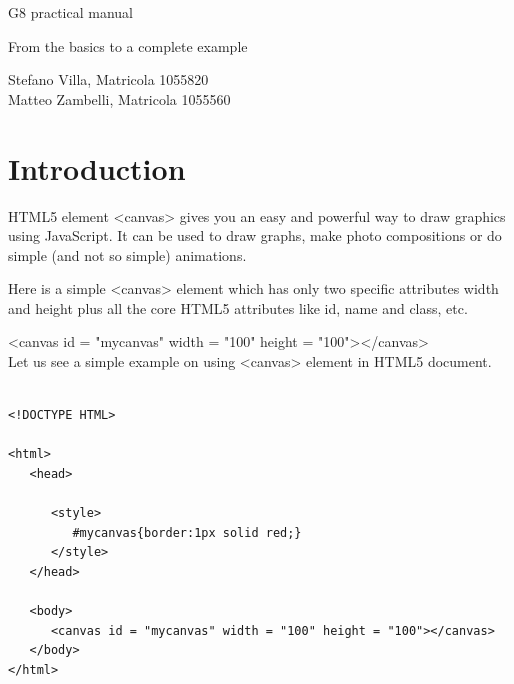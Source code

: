 \documentclass[a4paper]{article}
\begin{document}
\vspace{3\baselineskip}

\begin{center}
\begin{Huge}
G8 practical manual
\end{Huge}
\end{center}
\begin{center}
\begin{Huge}
From the basics to a complete example
\end{Huge}
\end{center}

\vspace{3\baselineskip}

\begin{Large}
\begin{center}
Stefano Villa, Matricola 1055820\\
Matteo Zambelli, Matricola 1055560
\end{center}
\end{Large}

\newpage
\tableofcontents
\newpage

\section{Introduction}

HTML5 element <canvas> gives you an easy and powerful way to draw graphics using JavaScript. It can be used to draw graphs, make photo compositions or do simple (and not so simple) animations.

Here is a simple <canvas> element which has only two specific attributes width and height plus all the core HTML5 attributes like id, name and class, etc.

<canvas id = "mycanvas" width = "100" height = "100"></canvas>\\

Let us see a simple example on using <canvas> element in HTML5 document.

\begin{verbatim}

<!DOCTYPE HTML>

<html>
   <head>
   
      <style>
         #mycanvas{border:1px solid red;}
      </style>
   </head>
   
   <body>
      <canvas id = "mycanvas" width = "100" height = "100"></canvas>
   </body>
</html>

\end{verbatim}
\end{document}
